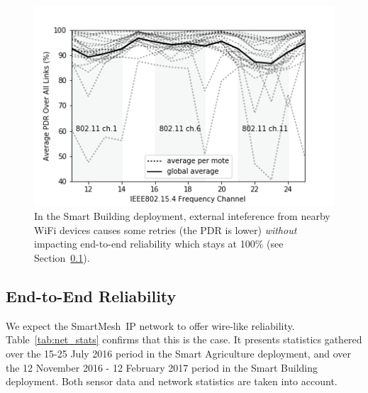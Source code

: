\documentclass{elsarticle}
\newcommand{\smip}                {SmartMesh~IP\xspace}
\newcommand{\building}            {Smart Building\xspace}
\newcommand{\agri}                {Smart Agriculture\xspace}
\begin{document}
\begin{figure}  
    \includegraphics[width=\columnwidth]{heatmap.png}
    \caption{In the \building deployment, external inteference from nearby WiFi devices causes some retries (the PDR is lower) \textit{without} impacting end-to-end reliability which stays at 100\% (see Section~\ref{sec:net_reliability}).}
    \label{fig:heatmap}
\end{figure}

\subsection{End-to-End Reliability}
\label{sec:net_reliability}


We expect the \smip network to offer wire-like reliability.
Table~\ref{tab:net_stats} confirms that this is the case.
It presents statistics gathered over the 15-25 July 2016 period in the \agri deployment, and over the 12 November 2016 - 12 February 2017 period in the \building deployment.
Both sensor data and network statistics are taken into account.
\end{document}
